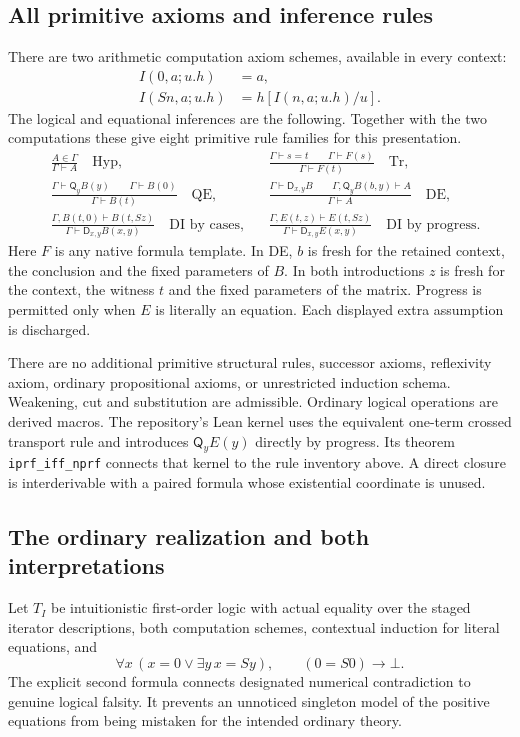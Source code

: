 \documentclass[11pt,a4paper]{article}
\theoremstyle{definition}\newtheorem{definition}[theorem]{Definition}
\theoremstyle{remark}\newtheorem{remark}[theorem]{Remark}
\newcommand{\D}{\mathsf D}
\newcommand{\Q}{\mathsf Q}
\begin{document}
\subsection{All primitive axioms and inference rules}
There are two arithmetic computation axiom schemes, available in every
context:
\begin{align*}
 I(0,a;u.h)&=a,\\
 I(Sn,a;u.h)&=h[I(n,a;u.h)/u].
\end{align*}
The logical and equational inferences are the following. Together with
the two computations these give eight primitive rule families for this
presentation.
\begin{align*}
 &\frac{A\in\Gamma}{\Gamma\vdash A}\quad\text{Hyp},
 &&\frac{\Gamma\vdash s=t\qquad\Gamma\vdash F(s)}
         {\Gamma\vdash F(t)}\quad\text{Tr},\\[5pt]
 &\frac{\Gamma\vdash\Q_yB(y)\qquad\Gamma\vdash B(0)}
         {\Gamma\vdash B(t)}\quad\text{QE},
 &&\frac{\Gamma\vdash\D_{x,y}B\qquad
          \Gamma,\Q_yB(b,y)\vdash A}
         {\Gamma\vdash A}\quad\text{DE},\\[5pt]
 &\frac{\Gamma,B(t,0)\vdash B(t,Sz)}
         {\Gamma\vdash\D_{x,y}B(x,y)}\quad\text{DI by cases},
 &&\frac{\Gamma,E(t,z)\vdash E(t,Sz)}
         {\Gamma\vdash\D_{x,y}E(x,y)}\quad\text{DI by progress}.
\end{align*}
Here $F$ is any native formula template. In DE, $b$ is fresh for the
retained context, the conclusion and the fixed parameters of $B$.
In both introductions $z$ is fresh for the context, the witness $t$
and the fixed parameters of the matrix. Progress is permitted only when
$E$ is literally an equation. Each displayed extra assumption is discharged.

There are no additional primitive structural rules, successor axioms,
reflexivity axiom, ordinary propositional axioms, or unrestricted induction
schema. Weakening, cut and substitution are admissible. Ordinary logical
operations are derived macros. The repository's Lean kernel uses the
equivalent one-term crossed transport rule and introduces $\Q_y E(y)$
directly by progress. Its theorem \texttt{iprf\_iff\_nprf} connects that
kernel to the rule inventory above. A direct closure is interderivable
with a paired formula whose existential coordinate is unused.

\subsection{The ordinary realization and both interpretations}
Let $T_I$ be intuitionistic first-order logic with actual equality over
the staged iterator descriptions, both computation schemes, contextual
induction for literal equations, and
\[
 \forall x\,(x=0\vee\exists y\,x=Sy),\qquad (0=S0)\to\bot.
\]
The explicit second formula connects designated numerical contradiction
to genuine logical falsity. It prevents an unnoticed singleton model of
the positive equations from being mistaken for the intended ordinary theory.
\end{document}
